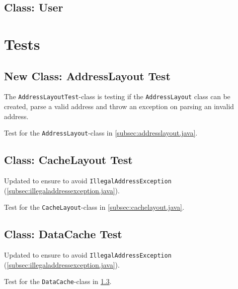 \documentclass[a4paper]{scrreprt}
\begin{document}


\subsection{Class: User}
\label{subsec:user.java}


\section{Tests}

\subsection{New Class: AddressLayout Test}
\label{subsec:addresslayouttest.java}

The \texttt{AddressLayoutTest}-class is testing if the \texttt{AddressLayout} class can be created, parse a valid address and throw an exception on parsing an invalid address.

Test for the \texttt{AddressLayout}-class in \ref{subsec:addresslayout.java}.



\subsection{Class: CacheLayout Test}
\label{subsec:cachelayouttest.java}

Updated to ensure to avoid \texttt{IllegalAddressException} (\ref{subsec:illegaladdressexception.java}).

Test for the \texttt{CacheLayout}-class in \ref{subsec:cachelayout.java}.



\subsection{Class: DataCache Test}
\label{subsec:datacachetest.java}

Updated to ensure to avoid \texttt{IllegalAddressException} (\ref{subsec:illegaladdressexception.java}).

Test for the \texttt{DataCache}-class in \ref{subsec:datacachetest.java}.


\end{document}
